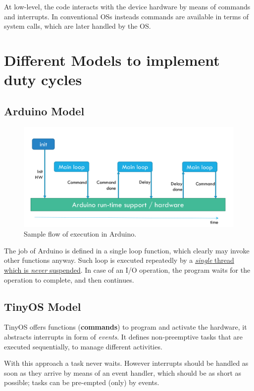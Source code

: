 At low-level, the code interacts with the device hardware by means of commands and interrupts. In conventional OSs insteads commands are available in terms of system calls, which are later handled by the OS.

\section{Different Models to implement duty cycles}
\subsection{Arduino Model}
\begin{figure}[htbp]
   \centering
   \includegraphics{images/arduino_model.png}
   \caption{Sample flow of execution in Arduino.}
   \label{fig:arduino_model}
\end{figure}
The job of Arduino is defined in a single loop function, which clearly may invoke other functions anyway.
Such loop is executed repeatedly by a \ul{\textit{single} thread which is \textit{never} suspended}.
In case of an I/O operation, the program waits for the operation to complete, and then continues.

\subsection{TinyOS Model}

TinyOS offers functions (\textbf{commands}) to program and activate the hardware, it abstracts interrupts in form of \textit{events}.
It defines non-preemptive tasks that are executed sequentially, to manage different activities.

With this approach a task never waits. However interrupts should be handled as soon
as they arrive by means of an event handler, which should be as short as possible; tasks can be pre-empted (only) by events.

